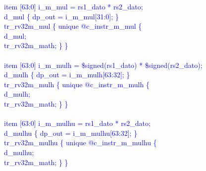 \textcolor{blue}{
\indent item [63:0] i\_m\_mul = rs1\_dato * rs2\_dato; \\%
\indent d\_mul \{ dp\_out = i\_m\_mul[31:0]; \}\\%
\indent tr\_rv32m\_mul \{ unique @c\_instr\_m\_mul \{ \\%
\indent \hspace{\parindent} d\_mul; \\%
\indent \hspace{\parindent} tr\_rv32m\_math; \} \} \\%
\\
\indent item [63:0] i\_m\_mulh = \$signed(rs1\_dato) * \$signed(rs2\_dato); \\%
\indent d\_mulh \{ dp\_out = i\_m\_mulh[63:32]; \}\\%
\indent tr\_rv32m\_mulh \{ unique @c\_instr\_m\_mulh \{ \\%
\indent \hspace{\parindent} d\_mulh; \\%
\indent \hspace{\parindent} tr\_rv32m\_math; \} \} \\%
\\
\indent item [63:0] i\_m\_mulhu = rs1\_dato * rs2\_dato; \\%
\indent d\_mulhu \{ dp\_out = i\_m\_mulhu[63:32]; \}\\%
\indent tr\_rv32m\_mulhu \{ unique @c\_instr\_m\_mulhu \{ \\%
\indent \hspace{\parindent} d\_mulhu; \\%
\indent \hspace{\parindent} tr\_rv32m\_math; \} \} \\%
\\
}
